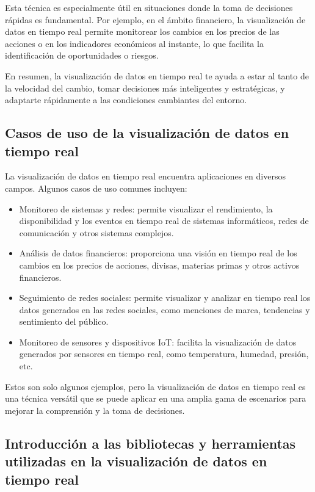 \documentclass[
  a4paper,
]{article}
\begin{document}
Esta técnica es especialmente útil en situaciones donde la toma de
decisiones rápidas es fundamental. Por ejemplo, en el ámbito financiero,
la visualización de datos en tiempo real permite monitorear los cambios
en los precios de las acciones o en los indicadores económicos al
instante, lo que facilita la identificación de oportunidades o riesgos.

En resumen, la visualización de datos en tiempo real te ayuda a estar al
tanto de la velocidad del cambio, tomar decisiones más inteligentes y
estratégicas, y adaptarte rápidamente a las condiciones cambiantes del
entorno.

\hypertarget{casos-de-uso-de-la-visualizaciuxf3n-de-datos-en-tiempo-real}{%
\subsection{Casos de uso de la visualización de datos en tiempo
real}\label{casos-de-uso-de-la-visualizaciuxf3n-de-datos-en-tiempo-real}}

La visualización de datos en tiempo real encuentra aplicaciones en
diversos campos. Algunos casos de uso comunes incluyen:

\begin{itemize}
\item
  Monitoreo de sistemas y redes: permite visualizar el rendimiento, la
  disponibilidad y los eventos en tiempo real de sistemas informáticos,
  redes de comunicación y otros sistemas complejos.
\item
  Análisis de datos financieros: proporciona una visión en tiempo real
  de los cambios en los precios de acciones, divisas, materias primas y
  otros activos financieros.
\item
  Seguimiento de redes sociales: permite visualizar y analizar en tiempo
  real los datos generados en las redes sociales, como menciones de
  marca, tendencias y sentimiento del público.
\item
  Monitoreo de sensores y dispositivos IoT: facilita la visualización de
  datos generados por sensores en tiempo real, como temperatura,
  humedad, presión, etc.
\end{itemize}

Estos son solo algunos ejemplos, pero la visualización de datos en
tiempo real es una técnica versátil que se puede aplicar en una amplia
gama de escenarios para mejorar la comprensión y la toma de decisiones.

\hypertarget{introducciuxf3n-a-las-bibliotecas-y-herramientas-utilizadas-en-la-visualizaciuxf3n-de-datos-en-tiempo-real}{%
\subsection{Introducción a las bibliotecas y herramientas utilizadas en
la visualización de datos en tiempo
real}\label{introducciuxf3n-a-las-bibliotecas-y-herramientas-utilizadas-en-la-visualizaciuxf3n-de-datos-en-tiempo-real}}
\end{document}
